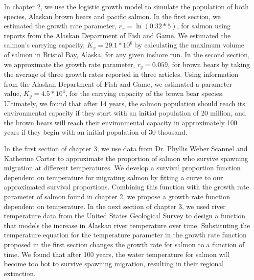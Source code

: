 
In chapter 2, we use the logistic growth model to simulate the population of both species, Alaskan brown bears and pacific salmon.
In the first section, we estimated the growth rate parameter, $r_x = \ln(0.32*5)$, for salmon using reports from the Alaskan Department of Fish and Game.
We estimated the salmon's carrying capacity, $K_x=29.1*10^6$ by calculating the maximum volume of salmon in Bristol Bay, Alaska, for any given inshore run.
In the second section, we approximate the growth rate parameter, $r_y=0.059$, for brown bears by taking the average of three growth rates reported in three articles.
Using information from the Alaskan Department of Fish and Game, we estimated a parameter value, $K_y=4.5*10^4$, for the carrying capacity of the brown bear species.
Ultimately, we found that after 14 years, the salmon population should reach its environmental capacity if they start with an initial population of 20 million, and the brown bears will reach their environmental capacity in approximately 100 years if they begin with an initial population of 30 thousand.

In the first section of chapter 3, we use data from Dr. Phyllis Weber Scannel and Katherine Carter to approximate the proportion of salmon who survive spawning migration at different temperatures.
We develop a survival proportion function dependent on temperature for migrating salmon by fitting a curve to our approximated survival proportions.
Combining this function with the growth rate parameter of salmon found in chapter 2, we propose a growth rate function dependent on temperature.
In the next section of chapter 3, we used river temperature data from the United States Geological Survey to design a function that models the increase in Alaskan river temperature over time.
Substituting the temperature equation for the temperature parameter in the growth rate function proposed in the first section changes the growth rate for salmon to a function of time.
We found that after 100 years, the water temperature for salmon will become too hot to survive spawning migration, resulting in their regional extinction.

